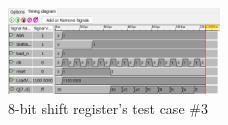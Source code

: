 \documentclass{article}
\begin{document}
\begin{enumerate}
\begin{figure}[ht!]
    \centering
    \includegraphics[width=0.5\textwidth]{lab4_shifter_test_3.png}
    \caption{8-bit shift register's test case \#3}
    \label{f:timing_shifter_bit3}
\end{figure}


\end{enumerate}
\end{document}
